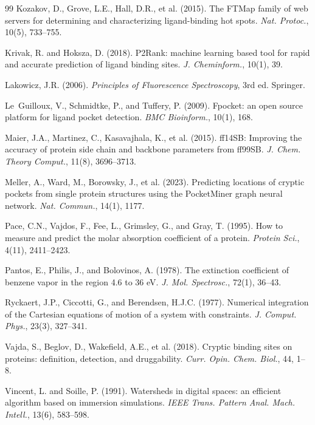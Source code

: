 \documentclass[11pt,twocolumn]{article}
\begin{document}
\begin{thebibliography}{99}
Kozakov, D., Grove, L.E., Hall, D.R., et al. (2015).
The FTMap family of web servers for determining and characterizing ligand-binding hot spots.
\textit{Nat. Protoc.}, 10(5), 733--755.

Krivak, R. and Hoksza, D. (2018).
P2Rank: machine learning based tool for rapid and accurate prediction of ligand binding sites.
\textit{J. Cheminform.}, 10(1), 39.

Lakowicz, J.R. (2006).
\textit{Principles of Fluorescence Spectroscopy}, 3rd ed. Springer.

Le~Guilloux, V., Schmidtke, P., and Tuffery, P. (2009).
Fpocket: an open source platform for ligand pocket detection.
\textit{BMC Bioinform.}, 10(1), 168.

Maier, J.A., Martinez, C., Kasavajhala, K., et al. (2015).
ff14SB: Improving the accuracy of protein side chain and backbone parameters from ff99SB.
\textit{J. Chem. Theory Comput.}, 11(8), 3696--3713.

Meller, A., Ward, M., Borowsky, J., et al. (2023).
Predicting locations of cryptic pockets from single protein structures using the PocketMiner graph neural network.
\textit{Nat. Commun.}, 14(1), 1177.

Pace, C.N., Vajdos, F., Fee, L., Grimsley, G., and Gray, T. (1995).
How to measure and predict the molar absorption coefficient of a protein.
\textit{Protein Sci.}, 4(11), 2411--2423.

Pantos, E., Philis, J., and Bolovinos, A. (1978).
The extinction coefficient of benzene vapor in the region 4.6 to 36 eV.
\textit{J. Mol. Spectrosc.}, 72(1), 36--43.

Ryckaert, J.P., Ciccotti, G., and Berendsen, H.J.C. (1977).
Numerical integration of the Cartesian equations of motion of a system with constraints.
\textit{J. Comput. Phys.}, 23(3), 327--341.

Vajda, S., Beglov, D., Wakefield, A.E., et al. (2018).
Cryptic binding sites on proteins: definition, detection, and druggability.
\textit{Curr. Opin. Chem. Biol.}, 44, 1--8.

Vincent, L. and Soille, P. (1991).
Watersheds in digital spaces: an efficient algorithm based on immersion simulations.
\textit{IEEE Trans. Pattern Anal. Mach. Intell.}, 13(6), 583--598.


\end{thebibliography}
\end{document}
